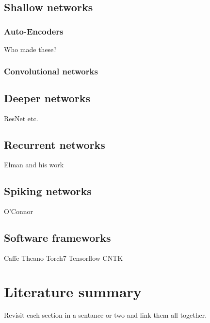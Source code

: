 \pagebreak

\subsection{Shallow networks}  

\subsubsection{Auto-Encoders}  %
Who made these?

\subsubsection{Convolutional networks}

\pagebreak
\subsection{Deeper networks}   %
ResNet etc.

\pagebreak
\subsection{Recurrent networks}  %
Elman and his work

\pagebreak
\subsection{Spiking networks}    %
O'Connor

\pagebreak
\subsection{Software frameworks}   %
Caffe Theano Torch7 Tensorflow CNTK


\section{Literature summary}      %
Revisit each section in a sentance or two and link them all together.



